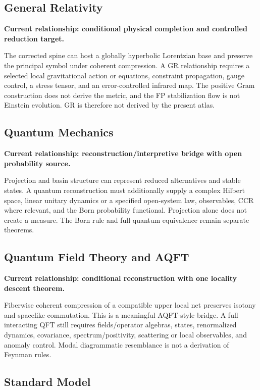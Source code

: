 \documentclass[11pt]{article}
\begin{document}
\subsection{General Relativity}

\textbf{Current relationship: conditional physical completion and controlled
reduction target.}

The corrected spine can host a globally hyperbolic Lorentzian base and preserve
the principal symbol under coherent compression. A GR relationship requires a
selected local gravitational action or equations, constraint propagation,
gauge control, a stress tensor, and an error-controlled infrared map. The
positive Gram construction does not derive the metric, and the FP stabilization
flow is not Einstein evolution. GR is therefore not derived by the present
atlas.

\subsection{Quantum Mechanics}

\textbf{Current relationship: reconstruction/interpretive bridge with open
probability source.}

Projection and basin structure can represent reduced alternatives and stable
states. A quantum reconstruction must additionally supply a complex Hilbert
space, linear unitary dynamics or a specified open-system law, observables,
CCR where relevant, and the Born probability functional. Projection alone
does not create a measure. The Born rule and full quantum equivalence remain
separate theorems.

\subsection{Quantum Field Theory and AQFT}

\textbf{Current relationship: conditional reconstruction with one locality
descent theorem.}

Fiberwise coherent compression of a compatible upper local net preserves
isotony and spacelike commutation. This is a meaningful AQFT-style bridge. A
full interacting QFT still requires fields/operator algebras, states,
renormalized dynamics, covariance, spectrum/positivity, scattering or local
observables, and anomaly control. Modal diagrammatic resemblance is not a
derivation of Feynman rules.

\subsection{Standard Model}
\end{document}
